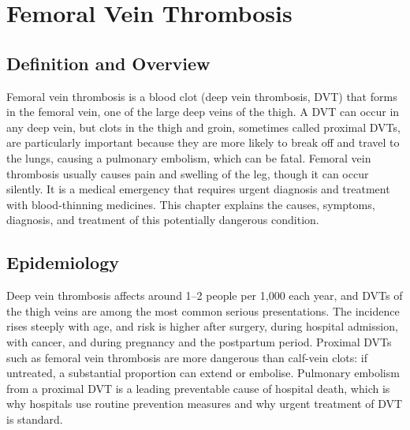 \chapter{Femoral Vein Thrombosis}

\section*{Definition and Overview}
Femoral vein thrombosis is a blood clot (deep vein thrombosis, DVT) that forms in the femoral vein, one of the large deep veins of the thigh. A DVT can occur in any deep vein, but clots in the thigh and groin, sometimes called proximal DVTs, are particularly important because they are more likely to break off and travel to the lungs, causing a pulmonary embolism, which can be fatal. Femoral vein thrombosis usually causes pain and swelling of the leg, though it can occur silently. It is a medical emergency that requires urgent diagnosis and treatment with blood-thinning medicines. This chapter explains the causes, symptoms, diagnosis, and treatment of this potentially dangerous condition.

\section*{Epidemiology}
Deep vein thrombosis affects around 1--2 people per 1,000 each year, and DVTs of the thigh veins are among the most common serious presentations. The incidence rises steeply with age, and risk is higher after surgery, during hospital admission, with cancer, and during pregnancy and the postpartum period. Proximal DVTs such as femoral vein thrombosis are more dangerous than calf-vein clots: if untreated, a substantial proportion can extend or embolise. Pulmonary embolism from a proximal DVT is a leading preventable cause of hospital death, which is why hospitals use routine prevention measures and why urgent treatment of DVT is standard.

